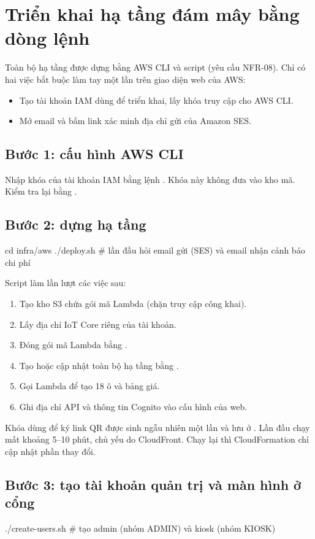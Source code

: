 \section{Triển khai hạ tầng đám mây bằng dòng lệnh}
\label{sec:trienkhaicloud}

Toàn bộ hạ tầng được dựng bằng AWS CLI và script (yêu cầu NFR-08). Chỉ có hai việc bắt buộc làm tay một lần trên giao diện web của AWS:
\begin{itemize}
  \item Tạo tài khoản IAM dùng để triển khai, lấy khóa truy cập cho AWS CLI.
  \item Mở email và bấm link xác minh địa chỉ gửi của Amazon SES.
\end{itemize}

\subsection*{Bước 1: cấu hình AWS CLI}
Nhập khóa của tài khoản IAM bằng lệnh . Khóa này không đưa vào kho mã. Kiểm tra lại bằng .

\subsection*{Bước 2: dựng hạ tầng}
\begin{lenh}
cd infra/aws
./deploy.sh   # lần đầu hỏi email gửi (SES) và email nhận cảnh báo chi phí
\end{lenh}
Script làm lần lượt các việc sau:
\begin{enumerate}
  \item Tạo kho S3 chứa gói mã Lambda (chặn truy cập công khai).
  \item Lấy địa chỉ IoT Core riêng của tài khoản.
  \item Đóng gói mã Lambda bằng .
  \item Tạo hoặc cập nhật toàn bộ hạ tầng bằng .
  \item Gọi Lambda  để tạo 18 ô và bảng giá.
  \item Ghi địa chỉ API và thông tin Cognito vào cấu hình của web.
\end{enumerate}
Khóa dùng để ký link QR được sinh ngẫu nhiên một lần và lưu ở . Lần đầu chạy mất khoảng 5--10 phút, chủ yếu do CloudFront. Chạy lại thì CloudFormation chỉ cập nhật phần thay đổi.

\subsection*{Bước 3: tạo tài khoản quản trị và màn hình ở cổng}
\begin{lenh}
./create-users.sh   # tạo admin (nhóm ADMIN) và kiosk (nhóm KIOSK)
\end{lenh}

